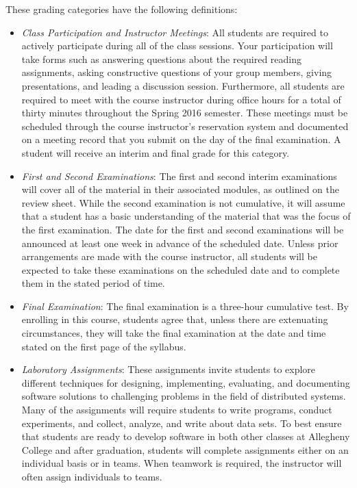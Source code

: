 \noindent
These grading categories have the following definitions:
\vspace*{-.1in}

\begin{itemize}

    \item {\em Class Participation and Instructor Meetings}: All students are required to actively participate
      during all of the class sessions. Your participation will take forms such as answering questions about the
      required reading assignments, asking constructive questions of your group members, giving presentations, and
      leading a discussion session. Furthermore, all students are required to meet with the course instructor during
      office hours for a total of thirty minutes throughout the Spring 2016 semester.  These meetings must be scheduled
      through the course instructor's reservation system and documented on a meeting record that you submit on the
      day of the final examination. A student will receive an interim and final grade for this category.

    \item {\em First and Second Examinations}: The first and second interim examinations will cover all of the material
      in their associated modules, as outlined on the review sheet.  While the second examination is not cumulative, it
      will assume that a student has a basic understanding of the material that was the focus of the first examination.
      The date for the first and second examinations will be announced at least one week in advance of the scheduled
      date.  Unless prior arrangements are made with the course instructor, all students will be expected to take these
      examinations on the scheduled date and to complete them in the stated period of time.

    \item {\em Final Examination}: The final examination is a three-hour cumulative test.  By enrolling in this
      course, students agree that, unless there are extenuating circumstances, they will take the final examination
      at the date and time stated on the first page of the syllabus.

    \item {\em Laboratory Assignments}: These assignments invite students to explore different techniques for designing,
      implementing, evaluating, and documenting software solutions to challenging problems in the field of distributed
      systems.  Many of the assignments will require students to write programs, conduct experiments, and collect,
      analyze, and write about data sets.  To best ensure that students are ready to develop software in both other
      classes at Allegheny College and after graduation, students will complete assignments either on an individual
      basis or in teams.  When teamwork is required, the instructor will often assign individuals to teams.


\end{itemize}
